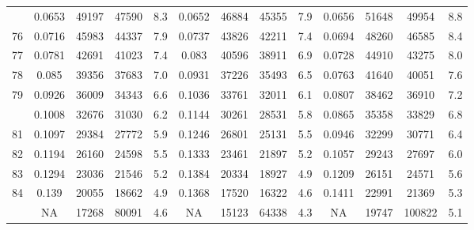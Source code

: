 \documentclass[
  14pt,
]{article}
\begin{document}
\begin{longtable}[t]{lcccccccccccc}
\addlinespace
75 & 0.0653 & 49197 & 47590 & 8.3 & 0.0652 & 46884 & 45355 & 7.9 & 0.0656 & 51648 & 49954 & 8.8\\
76 & 0.0716 & 45983 & 44337 & 7.9 & 0.0737 & 43826 & 42211 & 7.4 & 0.0694 & 48260 & 46585 & 8.4\\
77 & 0.0781 & 42691 & 41023 & 7.4 & 0.083 & 40596 & 38911 & 6.9 & 0.0728 & 44910 & 43275 & 8.0\\
78 & 0.085 & 39356 & 37683 & 7.0 & 0.0931 & 37226 & 35493 & 6.5 & 0.0763 & 41640 & 40051 & 7.6\\
79 & 0.0926 & 36009 & 34343 & 6.6 & 0.1036 & 33761 & 32011 & 6.1 & 0.0807 & 38462 & 36910 & 7.2\\
\addlinespace
80 & 0.1008 & 32676 & 31030 & 6.2 & 0.1144 & 30261 & 28531 & 5.8 & 0.0865 & 35358 & 33829 & 6.8\\
81 & 0.1097 & 29384 & 27772 & 5.9 & 0.1246 & 26801 & 25131 & 5.5 & 0.0946 & 32299 & 30771 & 6.4\\
82 & 0.1194 & 26160 & 24598 & 5.5 & 0.1333 & 23461 & 21897 & 5.2 & 0.1057 & 29243 & 27697 & 6.0\\
83 & 0.1294 & 23036 & 21546 & 5.2 & 0.1384 & 20334 & 18927 & 4.9 & 0.1209 & 26151 & 24571 & 5.6\\
84 & 0.139 & 20055 & 18662 & 4.9 & 0.1368 & 17520 & 16322 & 4.6 & 0.1411 & 22991 & 21369 & 5.3\\
\addlinespace
85 & NA & 17268 & 80091 & 4.6 & NA & 15123 & 64338 & 4.3 & NA & 19747 & 100822 & 5.1\\*
\end{longtable}
\end{document}
